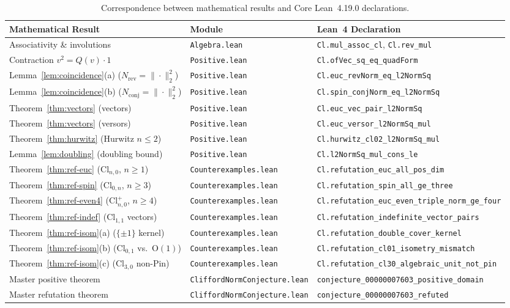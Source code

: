 \documentclass[11pt]{article}
\theoremstyle{definition}
\newcommand{\Cl}{\mathrm{Cl}}
\newcommand{\Orth}{\mathrm{O}}
\newcommand{\Nrev}{N_{\mathrm{rev}}}
\newcommand{\Nconj}{N_{\mathrm{conj}}}
\begin{document}
\begin{table}[htbp]
\centering
\caption{Correspondence between mathematical results and Core Lean~4.19.0 declarations.}
\label{tab:lean}
\footnotesize
\setlength{\tabcolsep}{4.5pt}
\begin{tabular}{@{}lll@{}}
\toprule
Mathematical Result & Module & Lean~4 Declaration \\
\midrule
Associativity \& involutions & \texttt{Algebra.lean} & \texttt{Cl.mul\_assoc\_cl}, \texttt{Cl.rev\_mul} \\
Contraction $v^2=Q(v)\cdot 1$ & \texttt{Positive.lean} & \texttt{Cl.ofVec\_sq\_eq\_quadForm} \\
Lemma~\ref{lem:coincidence}(a) ($\Nrev=\|\cdot\|_2^2$) & \texttt{Positive.lean} & \texttt{Cl.euc\_revNorm\_eq\_l2NormSq} \\
Lemma~\ref{lem:coincidence}(b) ($\Nconj=\|\cdot\|_2^2$) & \texttt{Positive.lean} & \texttt{Cl.spin\_conjNorm\_eq\_l2NormSq} \\
Theorem~\ref{thm:vectors} (vectors) & \texttt{Positive.lean} & \texttt{Cl.euc\_vec\_pair\_l2NormSq} \\
Theorem~\ref{thm:vectors} (versors) & \texttt{Positive.lean} & \texttt{Cl.euc\_versor\_l2NormSq\_mul} \\
Theorem~\ref{thm:hurwitz} (Hurwitz $n\le 2$) & \texttt{Positive.lean} & \texttt{Cl.hurwitz\_cl02\_l2NormSq\_mul} \\
Lemma~\ref{lem:doubling} (doubling bound) & \texttt{Positive.lean} & \texttt{Cl.l2NormSq\_mul\_cons\_le} \\
Theorem~\ref{thm:ref-euc} ($\Cl_{n,0}$, $n\ge 1$) & \texttt{Counterexamples.lean} & \texttt{Cl.refutation\_euc\_all\_pos\_dim} \\
Theorem~\ref{thm:ref-spin} ($\Cl_{0,n}$, $n\ge 3$) & \texttt{Counterexamples.lean} & \texttt{Cl.refutation\_spin\_all\_ge\_three} \\
Theorem~\ref{thm:ref-even4} ($\Cl_{n,0}^+$, $n\ge 4$) & \texttt{Counterexamples.lean} & \texttt{Cl.refutation\_euc\_even\_triple\_norm\_ge\_four} \\
Theorem~\ref{thm:ref-indef} ($\Cl_{1,1}$ vectors) & \texttt{Counterexamples.lean} & \texttt{Cl.refutation\_indefinite\_vector\_pairs} \\
Theorem~\ref{thm:ref-isom}(a) ($\{\pm 1\}$ kernel) & \texttt{Counterexamples.lean} & \texttt{Cl.refutation\_double\_cover\_kernel} \\
Theorem~\ref{thm:ref-isom}(b) ($\Cl_{0,1}$ vs.\ $\Orth(1)$) & \texttt{Counterexamples.lean} & \texttt{Cl.refutation\_cl01\_isometry\_mismatch} \\
Theorem~\ref{thm:ref-isom}(c) ($\Cl_{3,0}$ non-Pin) & \texttt{Counterexamples.lean} & \texttt{Cl.refutation\_cl30\_algebraic\_unit\_not\_pin} \\
Master positive theorem & \texttt{CliffordNormConjecture.lean} & \texttt{conjecture\_00000007603\_positive\_domain} \\
Master refutation theorem & \texttt{CliffordNormConjecture.lean} & \texttt{conjecture\_00000007603\_refuted} \\
\bottomrule
\end{tabular}
\end{table}
\end{document}
